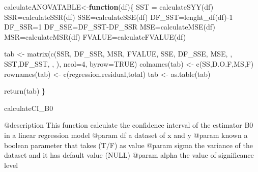 \documentclass[
]{article}
\newenvironment{Shaded}{\begin{snugshade}}{\end{snugshade}}
\newcommand{\AttributeTok}[1]{\textcolor[rgb]{0.77,0.63,0.00}{#1}}
\newcommand{\ConstantTok}[1]{\textcolor[rgb]{0.00,0.00,0.00}{#1}}
\newcommand{\ControlFlowTok}[1]{\textcolor[rgb]{0.13,0.29,0.53}{\textbf{#1}}}
\newcommand{\DecValTok}[1]{\textcolor[rgb]{0.00,0.00,0.81}{#1}}
\newcommand{\FunctionTok}[1]{\textcolor[rgb]{0.00,0.00,0.00}{#1}}
\newcommand{\NormalTok}[1]{#1}
\newcommand{\OtherTok}[1]{\textcolor[rgb]{0.56,0.35,0.01}{#1}}
\newcommand{\SpecialCharTok}[1]{\textcolor[rgb]{0.00,0.00,0.00}{#1}}
\newcommand{\StringTok}[1]{\textcolor[rgb]{0.31,0.60,0.02}{#1}}
\begin{document}
\begin{Shaded}
\begin{Highlighting}[]
\NormalTok{calculateANOVATABLE}\OtherTok{\textless{}{-}}\ControlFlowTok{function}\NormalTok{(df)\{}
\NormalTok{  SST }\OtherTok{=} \FunctionTok{calculateSYY}\NormalTok{(df)}
\NormalTok{  SSR}\OtherTok{=}\FunctionTok{calculateSSR}\NormalTok{(df)}
\NormalTok{  SSE}\OtherTok{=}\FunctionTok{calculateSSE}\NormalTok{(df)}
\NormalTok{  DF\_SST}\OtherTok{=}\FunctionTok{lenght\_df}\NormalTok{(df)}\SpecialCharTok{{-}}\DecValTok{1}
\NormalTok{  DF\_SSR}\OtherTok{=}\DecValTok{1}
\NormalTok{  DF\_SSE}\OtherTok{=}\NormalTok{DF\_SST}\SpecialCharTok{{-}}\NormalTok{DF\_SSR}
\NormalTok{  MSE}\OtherTok{=}\FunctionTok{calculateMSE}\NormalTok{(df)}
\NormalTok{  MSR}\OtherTok{=}\FunctionTok{calculateMSR}\NormalTok{(df)}
\NormalTok{  FVALUE}\OtherTok{=}\FunctionTok{calculateFVALUE}\NormalTok{(df)}
  
\NormalTok{  tab }\OtherTok{\textless{}{-}} \FunctionTok{matrix}\NormalTok{(}\FunctionTok{c}\NormalTok{(SSR, DF\_SSR, MSR, FVALUE, SSE, DF\_SSE, MSE,}\StringTok{\textquotesingle{} \textquotesingle{}}\NormalTok{, SST,DF\_SST,}\StringTok{\textquotesingle{} \textquotesingle{}}\NormalTok{,}\StringTok{\textquotesingle{} \textquotesingle{}}\NormalTok{), }\AttributeTok{ncol=}\DecValTok{4}\NormalTok{, }\AttributeTok{byrow=}\ConstantTok{TRUE}\NormalTok{)}
  \FunctionTok{colnames}\NormalTok{(tab) }\OtherTok{\textless{}{-}} \FunctionTok{c}\NormalTok{(}\StringTok{\textquotesingle{}SS\textquotesingle{}}\NormalTok{,}\StringTok{\textquotesingle{}D.O.F\textquotesingle{}}\NormalTok{,}\StringTok{\textquotesingle{}MS\textquotesingle{}}\NormalTok{,}\StringTok{\textquotesingle{}F\textquotesingle{}}\NormalTok{)}
  \FunctionTok{rownames}\NormalTok{(tab) }\OtherTok{\textless{}{-}} \FunctionTok{c}\NormalTok{(}\StringTok{\textquotesingle{}regression\textquotesingle{}}\NormalTok{,}\StringTok{\textquotesingle{}residual\textquotesingle{}}\NormalTok{,}\StringTok{\textquotesingle{}total\textquotesingle{}}\NormalTok{)}
\NormalTok{  tab }\OtherTok{\textless{}{-}} \FunctionTok{as.table}\NormalTok{(tab)}
  
  
  \FunctionTok{return}\NormalTok{(tab)}
\NormalTok{\}}
\end{Highlighting}
\end{Shaded}

calculateCI\_B0

@description This function calculate the confidence interval of the
estimator B0 in a linear regression model @param df a dataset of x and y
@param known a boolean parameter that takes (T/F) as value @param sigma
the variance of the dataset and it has default value (NULL) @param alpha
the value of significance level
\end{document}
